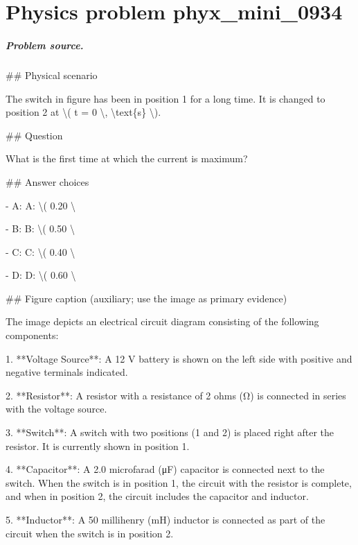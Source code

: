 
\chapter{Physics problem phyx\_mini\_0934}
\label{ch:PhyXMiniProblems_problem_phyx_mini_0934}

\paragraph{Problem source.}
\#\# Physical scenario

The switch in figure has been in position 1 for a long time. It is changed to position 2 at \textbackslash{}( t = 0 \textbackslash{}, \textbackslash{}text\{s\} \textbackslash{}).

\#\# Question

What is the first time at which the current is maximum?

\#\# Answer choices

- A: A: \textbackslash{}( 0.20 \textbackslash{}

- B: B: \textbackslash{}( 0.50 \textbackslash{}

- C: C: \textbackslash{}( 0.40 \textbackslash{}

- D: D: \textbackslash{}( 0.60 \textbackslash{}

\#\# Figure caption (auxiliary; use the image as primary evidence)

The image depicts an electrical circuit diagram consisting of the following components:

1. **Voltage Source**: A 12 V battery is shown on the left side with positive and negative terminals indicated.

2. **Resistor**: A resistor with a resistance of 2 ohms (Ω) is connected in series with the voltage source.

3. **Switch**: A switch with two positions (1 and 2) is placed right after the resistor. It is currently shown in position 1.

4. **Capacitor**: A 2.0 microfarad (μF) capacitor is connected next to the switch. When the switch is in position 1, the circuit with the resistor is complete, and when in position 2, the circuit includes the capacitor and inductor.

5. **Inductor**: A 50 millihenry (mH) inductor is connected as part of the circuit when the switch is in position 2.


